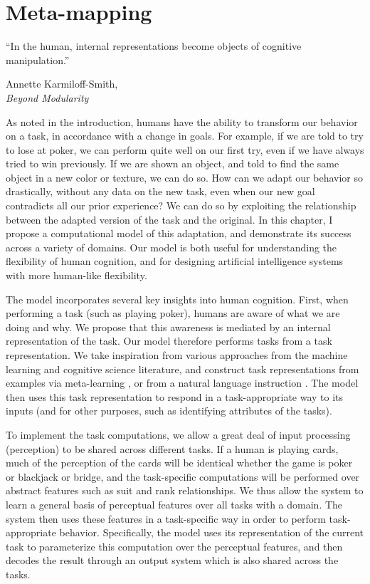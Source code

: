 \chapter{Meta-mapping} \label{chapter:zero_shot_via_homm}
\epigraph{``In the human, internal representations become objects of cognitive manipulation.''}{Annette Karmiloff-Smith,\\\textit{Beyond Modularity}}


As noted in the introduction, humans have the ability to transform our behavior on a task, in accordance with a change in goals. For example, if we are told to try to lose at poker, we can perform quite well on our first try, even if we have always tried to win previously. If we are shown an object, and told to find the same object in a new color or texture, we can do so. How can we adapt our behavior so drastically, without any data on the new task, even when our new goal contradicts all our prior experience? We can do so by exploiting the relationship between the adapted version of the task and the original. In this chapter, I propose a computational model of this adaptation, and demonstrate its success across a variety of domains. Our model is both useful for understanding the flexibility of human cognition, and for designing artificial intelligence systems with more human-like flexibility.   

The model incorporates several key insights into human cognition. First, when performing a task (such as playing poker), humans are aware of what we are doing and why. We propose that this awareness is mediated by an internal representation of the task. Our model therefore performs tasks from a task representation. We take inspiration from various approaches from the machine learning and cognitive science literature, and construct task representations from examples via meta-learning \citep[e.g.][]{Vinyals2016, Santoro2016, Finn2017a, Finn2018, Stadie2018, Botvinick2019}, or from a natural language instruction \citep{Larochelle2008, Hermann2017, Hill2019a}. The model then uses this task representation to respond in a task-appropriate way to its inputs (and for other purposes, such as identifying attributes of the tasks). 

To implement the task computations, we allow a great deal of input processing (perception) to be shared across different tasks. If a human is playing cards, much of the perception of the cards will be identical whether the game is poker or blackjack or bridge, and the task-specific computations will be performed over abstract features such as suit and rank relationships. We thus allow the system to learn a general basis of perceptual features over all tasks with a domain. The system then uses these features in a task-specific way in order to perform task-appropriate behavior. Specifically, the model uses its representation of the current task to parameterize this computation over the perceptual features, and then decodes the result through an output system which is also shared across the tasks. 

